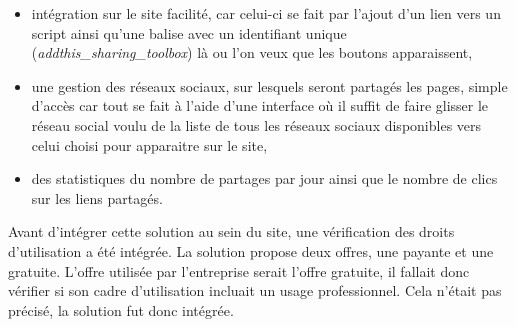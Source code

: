 \documentclass[12pt,a4paper]{article}
\begin{document}
\begin{itemize}
\item intégration sur le site facilité, car celui-ci se fait par l'ajout d'un lien vers un script ainsi qu'une balise avec un identifiant unique (\textit{addthis\_sharing\_toolbox}) là ou l'on veux que les boutons apparaissent,
\item une gestion des réseaux sociaux, sur lesquels seront partagés les pages, simple d'accès car tout se fait à l'aide d'une interface où il suffit de faire glisser le réseau social voulu de la liste de tous les réseaux sociaux disponibles vers celui choisi pour apparaitre sur le site,
\item des statistiques du nombre de partages par jour ainsi que le nombre de clics sur les liens partagés.
\end{itemize}\par
Avant d'intégrer cette solution au sein du site, une vérification des droits d'utilisation a été intégrée. La solution propose deux offres, une payante et une gratuite. L'offre utilisée par l'entreprise serait l'offre gratuite, il fallait donc vérifier si son cadre d'utilisation incluait un usage professionnel. Cela n'était pas précisé, la solution fut donc intégrée.\par
\end{document}
